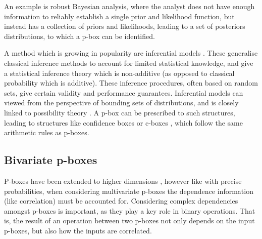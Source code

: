 \documentclass{juliacon}
\begin{document}
An example is robust Bayesian analysis, where the analyst does not have enough information to reliably establish a single prior and likelihood function, but instead has a collection of priors and likelihoods, leading to a set of posteriors distributions, to which a p-box can be identified.

A method which is growing in popularity are inferential models \cite{martin2015inferential}. These generalise classical inference methods to account for limited statistical knowledge, and give a statistical inference theory which is non-additive (as opposed to classical probability which is additive). These inference procedures, often based on random sets, give certain validity and performance guarantees. Inferential models can viewed from the perspective of bounding sets of distributions, and is closely linked to possibility theory \cite{liu2020inferential}. A p-box can be prescribed to such structures, leading to structures like confidence boxes or c-boxes \cite{fersoncomputing}, which follow the same arithmetic rules as p-boxes. 

\subsection{Bivariate p-boxes}

P-boxes have been extended to higher dimensions \cite{montes2015sklar}, however like with precise probabilities, when considering multivariate p-boxes the dependence information (like correlation) must be accounted for. Considering complex dependencies amongst p-boxes is important, as they play a key role in binary operations. That is, the result of an operation between two p-boxes not only depends on the input p-boxes, but also how the inputs are correlated.
\end{document}
